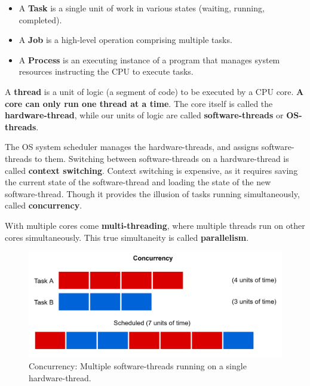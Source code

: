 \begin{Def}

    \begin{itemize}
        \item A \textbf{Task} is a single unit of work in various states (waiting, running, completed).
        \item A \textbf{Job} is a high-level operation comprising multiple tasks.
        \item A \textbf{Process} is an executing instance of a program that manages system resources instructing the CPU to execute tasks.
    \end{itemize}
\end{Def}

\newpage
\begin{Def}

    A \textbf{thread} is a unit of logic (a segment of code) to be executed by a CPU core. \textbf{A core can only run one thread at a time}.
    The core itself is called the \textbf{hardware-thread}, while our units of logic are called \textbf{software-threads} or \textbf{OS-threads}.

    The OS system scheduler manages the hardware-threads, and assigns software-threads to them. Switching between software-threads on a hardware-thread is called \textbf{context switching}.
    Context switching is expensive, as it requires saving the current state of the software-thread and loading the state of the new software-thread. Though it provides the illusion of tasks running simultaneously, 
    called \textbf{concurrency}.
    
    With multiple cores come \textbf{multi-threading}, where multiple threads run on other cores simultaneously.
    This true simultaneity is called \textbf{parallelism}.
\end{Def}
\begin{figure}[h]
    \centering
    \includegraphics[width=.75\textwidth]{./Sections/high/concurrency.png}
    \caption{Concurrency: Multiple software-threads running on a single hardware-thread.}
\end{figure}

